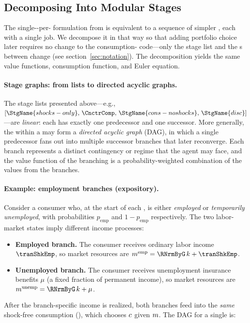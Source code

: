 \hypertarget{stages-within-a-period}{}
\subsection{Decomposing Into Modular Stages}\label{subsec:stageswithin}

The single-{\stg}-per-{\interval} formulation from  is equivalent to a sequence of simpler {\stgs}, each with a single job.  We decompose it in that way so that adding portfolio choice later requires no change to the consumption-{\stg} code---only the stage list and the {\Cnct}s between {\stgs} change (see section~\ref{sec:notation}).  The decomposition yields the same value functions, consumption function, and Euler equation.

\paragraph{Stage graphs: from lists to directed acyclic graphs.}
The stage lists presented above---e.g.,
$[\StgName{shocks-only},\, \CnctrComp,\, \StgName{cons-noshocks},\, \StgName{disc}]$---are
\textit{linear}: each {\stg} has exactly one predecessor and one successor.
More generally, the {\stgs} within a {\interval} may form a \textit{directed
acyclic graph} (DAG), in which a single predecessor {\stg} fans out into
multiple successor branches that later reconverge. Each branch represents a
distinct contingency or regime that the agent may face, and the {\Arrival}
value function of the branching {\stg} is a probability-weighted combination
of the {\Arrival} values from the branches.

\paragraph{Example: employment branches (expository).}
Consider a consumer who, at the start of each {\interval}, is either
\textit{employed} or \textit{temporarily unemployed}, with probabilities
$p_{\text{emp}}$ and $1 - p_{\text{emp}}$ respectively. The two labor-market
states imply different income processes:
\begin{itemize}
  \item \textbf{Employed branch.} The consumer receives ordinary labor income
    $\tranShkEmp$, so market resources are
    $\mNrm^{\text{emp}} = \RNrmByG\,\kNrm + \tranShkEmp$.
  \item \textbf{Unemployed branch.} The consumer receives unemployment
    insurance benefits $\mu$ (a fixed fraction of permanent income), so
    market resources are
    $\mNrm^{\text{unemp}} = \RNrmByG\,\kNrm + \mu$.
\end{itemize}
After the branch-specific income is realized, both branches feed into the
\textit{same} shock-free consumption {\stg} (),
which chooses $c$ given $m$. The DAG for a single {\interval} is:

